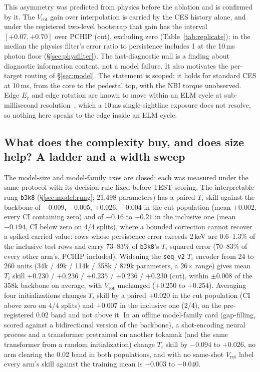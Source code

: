 \documentclass[10pt]{article}
\newcommand{\Ti}{\ensuremath{T_i}}
\newcommand{\Vrot}{\ensuremath{V_\mathrm{rot}}}
\newcommand{\seqv}{\texttt{seq\_v2}}
\newcommand{\bthree}{\texttt{b3k8}}
\begin{document}
This asymmetry was predicted from physics before the ablation and is confirmed by
it. The \Vrot{} gain over interpolation is carried by the CES history alone, and
under the registered two-level bootstrap that gain has the interval
$[+0.07, +0.70]$ over PCHIP (cut), excluding zero (Table~\ref{tab:replicate}); in
the median the physics filter's error ratio to persistence includes 1 at the 10\,ms
photon floor (\S\ref{sec:physfilter}). The fast-diagnostic null is a finding about diagnostic information content, not a model
failure. It also motivates the per-target routing of \S\ref{sec:model}. The
statement is scoped: it holds for standard CES at 10\,ms, from the core to the
pedestal top, with the NBI torque unobserved. Edge $E_r$ and edge rotation are known
to move within an ELM cycle at sub-millisecond
resolution~\citep{Viezzer2020Dynamics,Cavedon2017Pedestal}, which a 10\,ms
single-sightline exposure does not resolve, so nothing here speaks to the edge inside
an ELM cycle.

\subsection{What does the complexity buy, and does size help? A ladder and a
width sweep}
\label{sec:ladder}

The model-size and model-family axes are closed; each was measured under the same
protocol with its decision rule fixed before TEST scoring. The interpretable rung
\bthree{} (\S\ref{sec:model:rung}; 21{,}498 parameters) has a paired \Ti{} skill
against the backbone of $-0.009$, $-0.005$, $+0.026$, $-0.004$ in the cut population
(mean $+0.002$, every CI containing zero) and of $-0.16$ to $-0.21$ in the inclusive
one (mean $-0.194$, CI below zero on 4/4 splits), where a bounded correction cannot
recover a spiked carried value: rows whose persistence error exceeds 2\,keV are
0.6--1.3\% of the inclusive test rows and carry 73--83\% of \bthree{}'s \Ti{} squared
error (70--83\% of every other arm's, PCHIP included). Widening the \seqv{} \Ti{}
encoder from 24 to 260 units (34k / 49k / 114k / 358k / 879k parameters, a 26$\times$
range) gives mean \Ti{} skill $+0.230$ / $+0.236$ / $+0.235$ / $+0.236$ / $+0.230$
(cut), within $\pm 0.008$ of the 358k backbone on average, with \Vrot{} unchanged
($+0.250$ to $+0.254$). Averaging four initializations changes \Ti{} skill by a paired
$+0.020$ in the cut population (CI above zero on 4/4 splits) and $+0.007$ in the
inclusive one (2/4), on the pre-registered 0.02 band and not above it. In an offline
model-family card (gap-filling, scored against a bidirectional version of the backbone), a
shot-encoding neural process and a transformer pretrained on another tokamak (and the
same transformer from a random initialization) change \Ti{} skill by $-0.094$ to
$+0.026$, no arm clearing the 0.02 band in both populations, and with no same-shot
\Vrot{} label every arm's skill against the training mean is $-0.003$ to $-0.040$.
\end{document}
